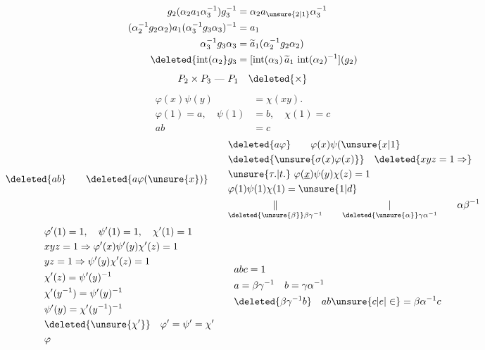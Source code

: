 \[
\begin{aligned}
 g_2(\alpha_2a_1\alpha_3^{-1})g_3^{-1}&=\alpha_2a_{\unsure{2|1}}\alpha_3^{-1}\\
 (\alpha_2^{-1}g_2\alpha_2)a_1(\alpha_3^{-1}g_3\alpha_3)^{-1}&=a_1\\
 \alpha_3^{-1}g_3\alpha_3&=\widetilde a_1(\alpha_2^{-1}g_2\alpha_2)\\
 \deleted{\operatorname{int}(\alpha_2}g_3&=[\operatorname{int}(\alpha_3)\,\widetilde a_1\,\operatorname{int}(\alpha_2)^{-1}](g_2)
\end{aligned}
\]
\[
 P_2\times P_3\ \text{---}\ P_1\quad\deleted{\times}
\]
\[
\begin{aligned}
 \varphi(x)\psi(y)&=\chi(xy).\\
 \varphi(1)=a,\quad \psi(1)&=b,\quad \chi(1)=c\\
 ab&=c
\end{aligned}
\]
\[
 \deleted{ab}\qquad\deleted{a\varphi(\unsure{x})}\qquad
 \begin{aligned}
 &\deleted{a\varphi}\qquad \varphi(x)\psi(\unsure{x|1}\\
 &\deleted{\unsure{\sigma(x)\varphi(x)}}\quad \deleted{xyz=1\Rightarrow}\\
 &\unsure{\tau.|t.}\ \varphi(\underline{x})\psi(y)\chi(z)=1\\
 &\varphi(1)\psi(1)\chi(1)=\unsure{1|d}\\
 &\underset{\deleted{\unsure{\beta}}\beta\gamma^{-1}}{\Vert}\qquad\underset{\deleted{\unsure{\alpha}}\gamma\alpha^{-1}}{|}\qquad \alpha\beta^{-1}
 \end{aligned}
\]
\[
\begin{aligned}
 &\varphi'(1)=1,\quad \psi'(1)=1,\quad \chi'(1)=1\\
 &xyz=1\Rightarrow \varphi'(x)\psi'(y)\chi'(z)=1\\
 &yz=1\Rightarrow \psi'(y)\chi'(z)=1\\
 &\chi'(z)=\psi'(y)^{-1}\\
 &\chi'(y^{-1})=\psi'(y)^{-1}\\
 &\psi'(y)=\chi'(y^{-1})^{-1}\\
 &\deleted{\unsure{\chi'}}\quad \varphi'=\psi'=\chi'\\
 &\varphi
\end{aligned}
\qquad
\begin{aligned}
 &abc=1\\
 &a=\beta\gamma^{-1}\quad b=\gamma\alpha^{-1}\\
 &\deleted{\beta\gamma^{-1}b}\quad ab\unsure{c|e|\in}=\beta\alpha^{-1}c
\end{aligned}
\]
